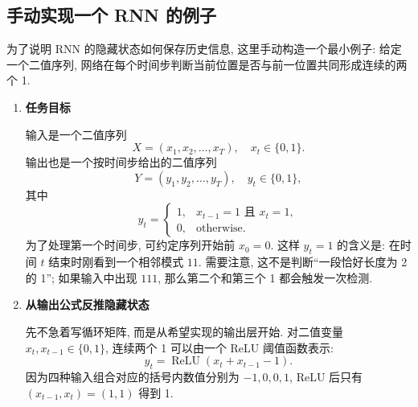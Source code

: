 \documentclass{../nndlcourse}
\begin{document}
\subsection{手动实现一个 RNN 的例子}

为了说明 RNN 的隐藏状态如何保存历史信息, 这里手动构造一个最小例子: 给定一个二值序列, 网络在每个时间步判断当前位置是否与前一位置共同形成连续的两个 1.

\begin{enumerate}
  \item \textbf{任务目标}

    输入是一个二值序列
    \begin{equation*}
      X=(x_1,x_2,\ldots,x_T), \quad x_t\in\{0,1\}.
    \end{equation*}
    输出也是一个按时间步给出的二值序列
    \begin{equation*}
      Y=(y_1,y_2,\ldots,y_T), \quad y_t\in\{0,1\},
    \end{equation*}
    其中
    \begin{equation*}
      y_t =
      \begin{cases}
        1, & x_{t-1}=1 \text{ 且 } x_t=1, \\
        0, & \text{otherwise}.
      \end{cases}
    \end{equation*}
    为了处理第一个时间步, 可约定序列开始前 $x_0=0$. 这样 $y_t=1$ 的含义是: 在时间 $t$ 结束时刚看到一个相邻模式 $11$. 需要注意, 这不是判断“一段恰好长度为 2 的 1”; 如果输入中出现 $111$, 那么第二个和第三个 1 都会触发一次检测.

  \item \textbf{从输出公式反推隐藏状态}

    先不急着写循环矩阵, 而是从希望实现的输出层开始. 对二值变量 $x_t,x_{t-1}\in\{0,1\}$, 连续两个 1 可以由一个 ReLU 阈值函数表示:
    \begin{equation*}
      y_t
      = \operatorname{ReLU}\left(x_t + x_{t-1} - 1\right).
    \end{equation*}
    因为四种输入组合对应的括号内数值分别为 $-1,0,0,1$, ReLU 后只有 $(x_{t-1},x_t)=(1,1)$ 得到 1.


\end{enumerate}
\end{document}
